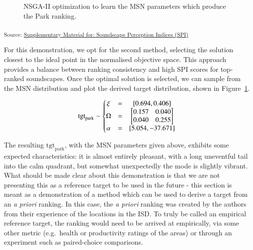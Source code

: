\documentclass[
  authoryear,
  3p]{elsarticle}
\begin{document}
\begin{figure}
\begin{minipage}{0.50\linewidth}
{}


\end{minipage}%

\caption{\label{fig-pymoo-parks}NSGA-II optimization to learn the MSN
parameters which produce the Park ranking.}

\end{figure}%

\textsubscript{Source:
\href{https://MitchellAcoustics.github.io/J2401_JASA_SSID-Single-Index/notebooks/TargetOptimization-preview.html\#cell-fig-pymoo-parks}{Supplementary
Material for: Soundscape Perception Indices (SPI) }}

For this demonstration, we opt for the second method, selecting the
solution closest to the ideal point in the normalised objective space.
This approach provides a balance between ranking consistency and high
SPI scores for top-ranked soundscapes. Once the optimal solution is
selected, we can sample from the MSN distribution and plot the derived
target distribution, shown in Figure~\ref{fig-pymoo-parks}.

\[
\textup{tgt}_{\textup{park}} \sim  \left\{\begin{matrix}
    \xi&=&[0.694, 0.406] \\
    \Omega&=&\begin{bmatrix}
        0.157 & 0.040 \\ 
        0.040 & 0.255 
    \end{bmatrix} \\
    \alpha&=&[5.054, -37.671]
\end{matrix}\right.
\]

The resulting \(\text{tgt}_{\text{park}}\), with the MSN parameters
given above, exhibits some expected characteristics: it is almost
entirely pleasant, with a long uneventful tail into the calm quadrant,
but somewhat unexpectedly the mode is slightly vibrant. What should be
made clear about this demonstration is that we are not presenting this
as a reference target to be used in the future - this section is meant
as a demonstration of a method which can be used to derive a target from
an \emph{a priori} ranking. In this case, the \emph{a priori} ranking
was created by the authors from their experience of the locations in the
ISD. To truly be called an empirical reference target, the ranking would
need to be arrived at empirically, via some other metric (e.g.~health or
productivity ratings of the areas) or through an experiment such as
paired-choice comparisons.
\end{document}
